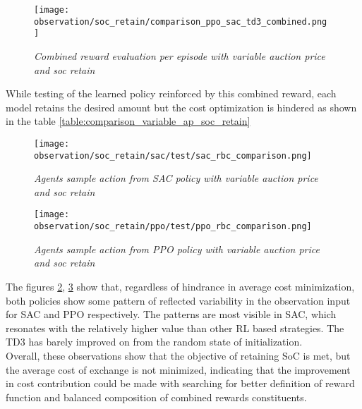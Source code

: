 \begin{large}
\begin{figure}[h]
	\begin{center}
		\texttt{[image: observation/soc\_retain/comparison\_ppo\_sac\_td3\_combined.png ]}
		\caption{ \textit{Combined reward evaluation per episode with variable auction price and soc retain} }
		\label{fig:comparison_ppo_sac_td3_combined_soc_retain}
	\end{center}
\end{figure}

While testing of the learned policy reinforced by this combined reward, each model retains the desired amount but the cost optimization is hindered as shown in the table \ref{table:comparison_variable_ap_soc_retain} \\

\begin{figure}[h]
	\begin{center}
		\texttt{[image: observation/soc\_retain/sac/test/sac\_rbc\_comparison.png]}
		\caption{ \textit{Agents sample action from SAC policy with variable auction price and soc retain}}
		\label{fig:test_compare_soc_retain_sac}
	\end{center}
\end{figure}

\begin{figure}[h]
	\begin{center}
		\texttt{[image: observation/soc\_retain/ppo/test/ppo\_rbc\_comparison.png]}
		\caption{ \textit{Agents sample action from PPO policy with variable auction price and soc retain}}
		\label{fig:test_compare_soc_retain_ppo}
	\end{center}
\end{figure}

The figures \ref{fig:test_compare_soc_retain_sac}, \ref{fig:test_compare_soc_retain_ppo} show that, regardless of hindrance in average cost minimization, both policies show some pattern of reflected variability in the observation input for SAC and PPO respectively. The patterns are most visible in SAC, which resonates with the relatively higher value than other RL based strategies. The TD3 has barely improved on from the random state of initialization. \\

Overall, these observations show that the objective of retaining SoC is met, but the average cost of exchange is not minimized, indicating that the improvement in cost contribution could be made with searching for better definition of reward function and balanced composition of combined rewards constituents. \\


\end{large}
